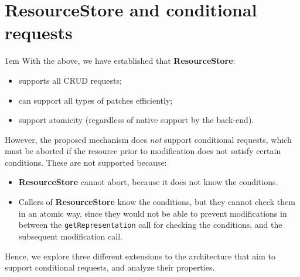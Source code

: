 \documentclass[10pt]{article}
\newenvironment{Note}
  {\begin{multicols}{3}%
     \parskip 1em}
  {\end{multicols}}
\begin{document}
\section*{ResourceStore and conditional requests}
\begin{Note}
With the above,
we have established that \textbf{ResourceStore}:
\begin{itemize}
  \item supports all CRUD requests;
  \item can support all types of patches efficiently;
  \item support atomicity
        (regardless of native support by the back-end).
\end{itemize}

\columnbreak
However, the proposed mechanism
does \emph{not} support conditional requests,
which must be aborted if the resource
prior to modification
does not satisfy certain conditions.
These are not supported because:
\begin{itemize}
  \item \textbf{ResourceStore} cannot abort,
        because it does not know the conditions.
  \item Callers of \textbf{ResourceStore} know the conditions,
        but they cannot check them in an atomic way,
        since they would not be able to prevent modifications
        in between the \verb!getRepresentation! call for checking the conditions,
        and the subsequent modification call.
\end{itemize}

\columnbreak
Hence,
we explore three different extensions to the architecture
that aim to support conditional requests,
and analyze their properties.

\end{Note}
\end{document}
